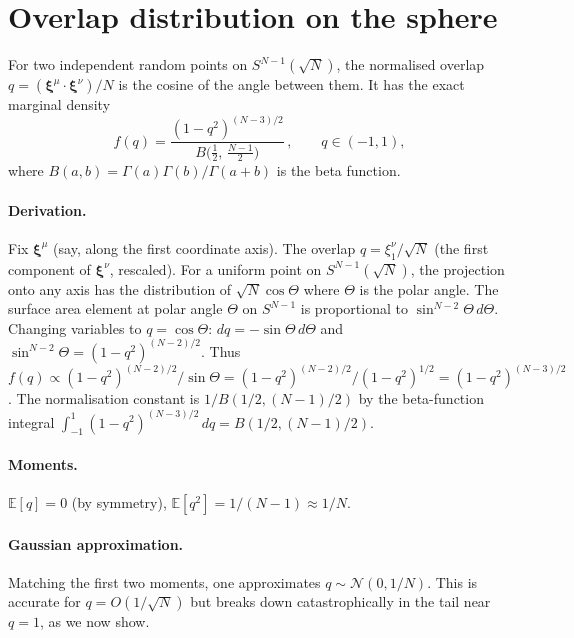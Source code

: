 \documentclass[11pt]{article}
\newcommand{\bxi}{\boldsymbol{\xi}}
\begin{document}
\section{Overlap distribution on the sphere}
\label{sec:overlap}

For two independent random points on $S^{N-1}(\sqrt{N})$,
the normalised overlap $q = (\bxi^\mu \cdot \bxi^\nu)/N$
is the cosine of the angle between them.
It has the exact marginal density
\begin{equation}\label{eq:fq}
  f(q) = \frac{(1 - q^2)^{(N-3)/2}}{B\!\bigl(\tfrac{1}{2},\,
    \tfrac{N-1}{2}\bigr)}\,,
  \qquad q \in (-1, 1),
\end{equation}
where $B(a,b) = \Gamma(a)\Gamma(b)/\Gamma(a+b)$ is the
beta function.

\paragraph{Derivation.}
Fix $\bxi^\mu$ (say, along the first coordinate axis).
The overlap $q = \xi^\nu_1/\sqrt{N}$ (the first component of
$\bxi^\nu$, rescaled).
For a uniform point on $S^{N-1}(\sqrt{N})$, the projection
onto any axis has the distribution of $\sqrt{N}\cos\Theta$
where $\Theta$ is the polar angle.
The surface area element at polar angle $\Theta$ on
$S^{N-1}$ is proportional to $\sin^{N-2}\Theta\,d\Theta$.
Changing variables to $q = \cos\Theta$:
$dq = -\sin\Theta\,d\Theta$ and
$\sin^{N-2}\Theta = (1-q^2)^{(N-2)/2}$.
Thus $f(q) \propto (1-q^2)^{(N-2)/2}/\sin\Theta
= (1-q^2)^{(N-2)/2}/(1-q^2)^{1/2}
= (1-q^2)^{(N-3)/2}$.
The normalisation constant is $1/B(1/2, (N{-}1)/2)$
by the beta-function integral
$\int_{-1}^{1}(1-q^2)^{(N-3)/2}\,dq = B(1/2, (N{-}1)/2)$.

\paragraph{Moments.}
$\mathbb{E}[q] = 0$ (by symmetry),
$\mathbb{E}[q^2] = 1/(N{-}1) \approx 1/N$.

\paragraph{Gaussian approximation.}
Matching the first two moments, one approximates
$q \sim \mathcal{N}(0, 1/N)$.  This is accurate for
$q = O(1/\sqrt{N})$ but breaks down catastrophically
in the tail near $q = 1$, as we now show.


\end{document}
